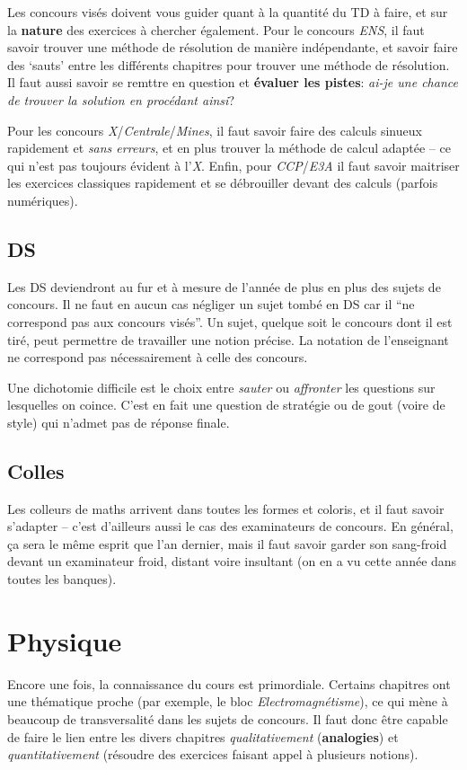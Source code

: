 \documentclass{article}
\begin{document}
Les concours visés doivent vous guider quant à la quantité du TD à faire, et sur la \textbf{nature} des exercices à chercher également.
Pour le concours \textit{ENS}, il faut savoir trouver une méthode de résolution de manière indépendante, et savoir faire des `sauts' entre les différents chapitres pour trouver une méthode de résolution.
Il faut aussi savoir se remttre en question et \textbf{évaluer les pistes}: \textit{ai-je une chance de trouver la solution en procédant ainsi}?

Pour les concours \textit{X}/\textit{Centrale}/\textit{Mines}, il faut savoir faire des calculs sinueux rapidement et \textit{sans erreurs}, et en plus trouver la méthode de calcul adaptée -- ce qui n'est pas toujours évident à l'\textit{X}.
Enfin, pour \textit{CCP}/\textit{E3A} il faut savoir maitriser les exercices classiques rapidement et se débrouiller devant des calculs (parfois numériques).

\subsection{DS}
Les DS deviendront au fur et à mesure de l'année de plus en plus des sujets de concours.
Il ne faut en aucun cas négliger un sujet tombé en DS car il ``ne correspond pas aux concours visés''.
Un sujet, quelque soit le concours dont il est tiré, peut permettre de travailler une notion précise.
La notation de l'enseignant ne correspond pas nécessairement à celle des concours.

Une dichotomie difficile est le choix entre \textit{sauter} ou \textit{affronter} les questions sur lesquelles on coince.
C'est en fait une question de stratégie ou de gout (voire de style) qui n'admet pas de réponse finale.

\subsection{Colles}
Les colleurs de maths arrivent dans toutes les formes et coloris, et il faut savoir s'adapter -- c'est d'ailleurs aussi le cas des examinateurs de concours.
En général, ça sera le même esprit que l'an dernier, mais il faut savoir garder son sang-froid devant un examinateur froid, distant voire insultant (on en a vu cette année dans toutes les banques).

\section{Physique}
Encore une fois, la connaissance du cours est primordiale.
Certains chapitres ont une thématique proche (par exemple, le bloc \textit{Electromagnétisme}), ce qui mène à beaucoup de transversalité dans les sujets de concours.
Il faut donc être capable de faire le lien entre les divers chapitres \textit{qualitativement} (\textbf{analogies}) et \textit{quantitativement} (résoudre des exercices faisant appel à plusieurs notions).
\end{document}
